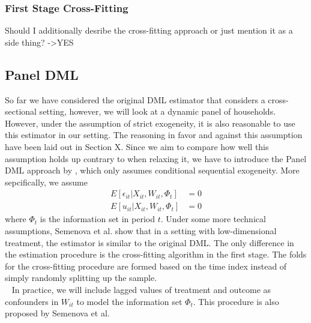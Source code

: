 \subsubsection{First Stage Cross-Fitting}
Should I additionally desribe the cross-fitting approach or just mention it as a side thing? ->YES

\subsection{Panel DML}
So far we have considered the original DML estimator that considers a cross-sectional setting, however, we will look at a dynamic panel of households. However, under the assumption of strict exogeneity, it is also reasonable to use this estimator in our setting. The reasoning in favor and against this assumption have been laid out in Section X. Since we aim to compare how well this assumption holds up contrary to when relaxing it, we have to introduce the Panel DML approach by \cite{PanelDML}, which only assumes conditional sequential exogeneity. More sepcifically, we assume 
\begin{align*}
    E[\epsilon_{it}|X_{it}, W_{it}, \Phi_{t}]&=0 \\ 
    E[u_{it}|X_{it}, W_{it}, \Phi_{t}]&=0
\end{align*}
where $\Phi_t$ is the information set in period $t$. Under some more technical assumptions, Semenova et al. show that in a setting with low-dimensional treatment, the estimator is similar to the original DML. The only difference in the estimation procedure is the cross-fitting algorithm in the first stage. The folds for the cross-fitting procedure are formed based on the time index instead of simply randomly splitting up the sample. \\ 
In practice, we will include lagged values of treatment and outcome as confounders in $W_{it}$ to model the information set $\Phi_{t}$. This procedure is also proposed by Semenova et al. 

